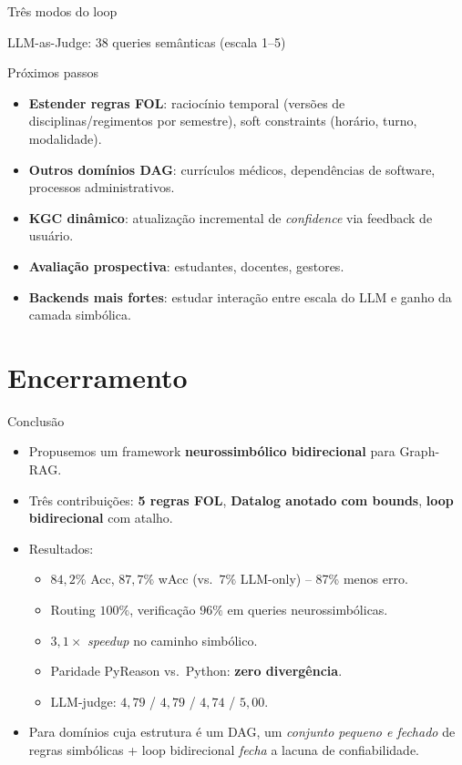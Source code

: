 \documentclass[aspectratio=169]{beamer}
\begin{document}
\begin{frame}{Três modos do loop}
\begin{frame}{LLM-as-Judge: 38 queries semânticas (escala 1--5)}
\begin{frame}{Próximos passos}
  \begin{itemize}
    \item \textbf{Estender regras FOL}: raciocínio temporal (versões de disciplinas/regimentos por semestre), soft constraints (horário, turno, modalidade).
    \item \textbf{Outros domínios DAG}: currículos médicos, dependências de software, processos administrativos.
    \item \textbf{KGC dinâmico}: atualização incremental de \emph{confidence} via feedback de usuário.
    \item \textbf{Avaliação prospectiva}: estudantes, docentes, gestores.
    \item \textbf{Backends mais fortes}: estudar interação entre escala do LLM e ganho da camada simbólica.
  \end{itemize}
\end{frame}

\section*{Encerramento}

\begin{frame}{Conclusão}
  \begin{itemize}
    \item Propusemos um framework \textbf{neurossimbólico bidirecional} para Graph-RAG.
    \item Três contribuições: \textbf{5 regras FOL}, \textbf{Datalog anotado com bounds}, \textbf{loop bidirecional} com atalho.
    \item Resultados:
      \begin{itemize}\small
        \item $84{,}2\%$ Acc, $87{,}7\%$ wAcc (vs.\ $7\%$ LLM-only) -- 87\% menos erro.
        \item Routing $100\%$, verificação $96\%$ em queries neurossimbólicas.
        \item $3{,}1\times$ \emph{speedup} no caminho simbólico.
        \item Paridade PyReason vs.\ Python: \textbf{zero divergência}.
        \item LLM-judge: $4{,}79$ / $4{,}79$ / $4{,}74$ / $5{,}00$.
      \end{itemize}
    \item Para domínios cuja estrutura é um DAG, um \emph{conjunto pequeno e fechado} de regras simbólicas + loop bidirecional \emph{fecha} a lacuna de confiabilidade.
  \end{itemize}
\end{frame}


\end{frame}
\end{frame}
\end{document}
